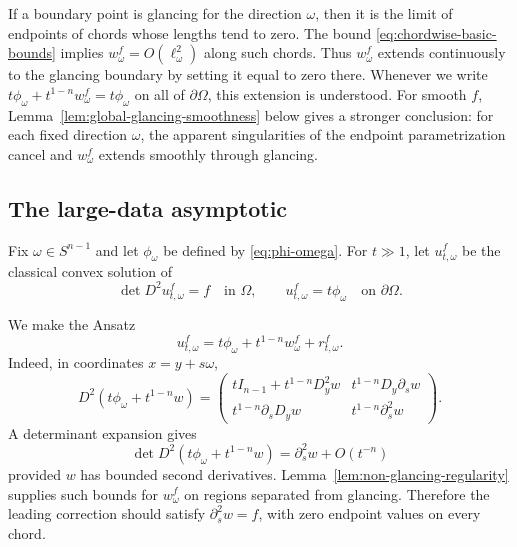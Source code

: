 \documentclass[11pt]{article}
\numberwithin{equation}{section}
\newcommand{\bd}{\partial}
\newcommand{\Om}{\Omega}
\begin{document}
If a boundary point is glancing for the direction \(\omega\), then it is the limit of endpoints of chords whose lengths tend to zero.  The bound \eqref{eq:chordwise-basic-bounds} implies \(w_\omega^f=O(\ell_\omega^2)\) along such chords.  Thus \(w_\omega^f\) extends continuously to the glancing boundary by setting it equal to zero there.  Whenever we write \(t\phi_\omega+t^{1-n}w_\omega^f=t\phi_\omega\) on all of \(\bd\Om\), this extension is understood.  For smooth \(f\), Lemma~\ref{lem:global-glancing-smoothness} below gives a stronger conclusion: for each fixed direction \(\omega\), the apparent singularities of the endpoint parametrization cancel and \(w_\omega^f\) extends smoothly through glancing.


\subsection{The large-data asymptotic}\label{subsec:large-data-asymptotic-statement}

Fix \(\omega\in S^{n-1}\) and let \(\phi_\omega\) be defined by \eqref{eq:phi-omega}.  For \(t\gg1\), let \(u_{t,\omega}^f\) be the classical convex solution of
\begin{equation}\label{eq:large-data-problem}
    \det D^2u_{t,\omega}^f=f
    \quad\text{in }\Om,
    \qquad
    u_{t,\omega}^f=t\phi_\omega
    \quad\text{on }\bd\Om.
\end{equation}

We make the Ansatz
\begin{equation}\label{eq:large-data-formal}
    u_{t,\omega}^f
    =
    t\phi_\omega+t^{1-n}w_\omega^f+r_{t,\omega}^f.
\end{equation}
Indeed, in coordinates \(x=y+s\omega\),
\[
    D^2(t\phi_\omega+t^{1-n}w)
    =
    \begin{pmatrix}
        tI_{n-1}+t^{1-n}D_y^2w
        &
        t^{1-n}D_y\partial_s w \\[1mm]
        t^{1-n}\partial_sD_yw
        &
        t^{1-n}\partial_s^2w
    \end{pmatrix}.
\]
A determinant expansion gives
\begin{equation}\label{eq:det-expansion}
    \det D^2(t\phi_\omega+t^{1-n}w)
    =
    \partial_s^2w+O(t^{-n})
\end{equation}
provided \(w\) has bounded second derivatives.  Lemma~\ref{lem:non-glancing-regularity} supplies such bounds for \(w_\omega^f\) on regions separated from glancing.  Therefore the leading correction should satisfy \(\partial_s^2w=f\), with zero endpoint values on every chord.
\end{document}
